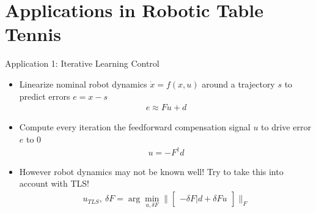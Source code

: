 \documentclass[handout]{beamer}
\begin{document}
\section{Applications in Robotic Table Tennis}
%
\begin{frame}{Application 1: Iterative Learning Control}
\begin{itemize}
\item Linearize nominal robot dynamics $\dot{x} = f(x,u)$ around a trajectory $s$ to predict errors $e = x - s$
\begin{equation}
\begin{aligned}
e \approx Fu + d
\end{aligned}
\end{equation}
\item Compute every iteration the feedforward compensation signal $u$ to drive error $e$ to $0$
\begin{equation}
\begin{aligned}
u = -F^{\dagger}d
\end{aligned}
\end{equation}
\item However robot dynamics may not be known well! Try to take this into account with TLS!
\begin{equation}
\begin{aligned}
u_{TLS}, \ \delta F = \arg\min_{u,\delta F} \|\begin{bmatrix}-\delta F |d+\delta F u\end{bmatrix} \|_{F}
\end{aligned}
\end{equation}
\end{itemize}
\end{frame}
%
\end{document}
